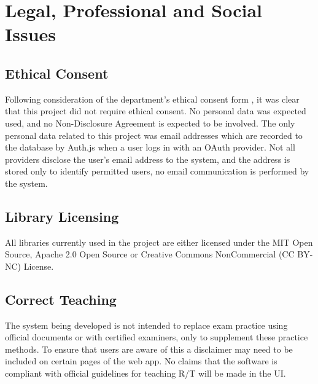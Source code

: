 \section{Legal, Professional and Social Issues}
\label{LegalProfSocial}
\subsection{Ethical Consent}
Following consideration of the department's ethical consent form \cite{ethical-consent}, it was clear that this project did not require ethical consent. No personal data was expected used, and no Non-Disclosure Agreement is expected to be involved. The only personal data related to this project was email addresses which are recorded to the database by Auth.js when a user logs in with an OAuth provider. Not all providers disclose the user's email address to the system, and the address is stored only to identify permitted users, no email communication is performed by the system.


\subsection{Library Licensing}
All libraries currently used in the project are either licensed under the MIT Open Source, Apache 2.0 Open Source or Creative Commons NonCommercial (CC BY-NC) License.

\subsection{Correct Teaching}
The system being developed is not intended to replace exam practice using official documents or with certified examiners, only to supplement these practice methods. To ensure that users are aware of this a disclaimer may need to be included on certain pages of the web app. No claims that the software is compliant with official guidelines for teaching R/T will be made in the UI.
